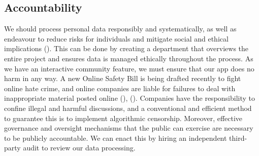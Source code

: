 \subsection{Accountability} 
We should process personal data responsibly and systematically, as well as endeavour to reduce risks for individuals and mitigate social and ethical implications (\cite{principles}).
This can be done by creating a department that overviews the entire project and ensures data is managed ethically throughout the process. As we have an interactive community 
feature, we must ensure that our app does no harm in any way. A new Online Safety Bill is being drafted recently to fight online hate crime, and online companies are liable for failures to
deal with inappropriate material posted online (\cite{francis}), (\cite{parliamentlaw}). Companies have the responsibility to confine illegal and harmful discussions, and a conventional and efficient method
to guarantee this is to implement algorithmic censorship. 
Moreover, effective governance and oversight mechanisms that the public can exercise are necessary to be publicly accountable. 
We can enact this by hiring an independent third-party audit to review our data processing.

